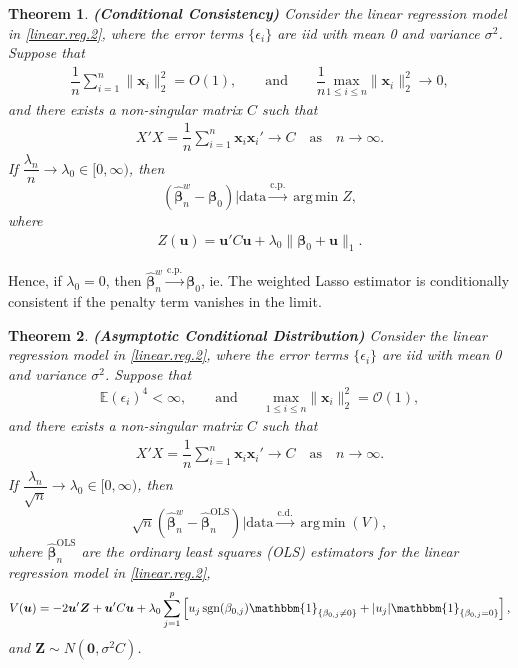 \documentclass[12pt]{article}
\DeclareMathOperator*{\argmin}{arg\,min} %
\newcommand{\EX}{\mathbb{E}} %
\newcommand{\bnw}{\widehat{\bm{\beta}}_n^w} %
\newcommand{\bLS}{\widehat{\bm{\beta}}_n^{\text{OLS}}} %
\newcommand{\be}{\bm{\beta}} %
\newcommand{\sumin}{\sum_{i=1}^n} %
\newcommand{\dn}{\dfrac{1}{n}} %
\newcommand{\CONV}[1]{\stackrel{\text{#1}}{\longrightarrow}} %
\newcommand{\x}{\bm{x}_i} %
\newcommand{\bu}{\bm{u}} %
\newtheorem{thm}{Theorem}[section]
\begin{document}
\begin{thm} \label{consistency}
	\textbf{(Conditional Consistency)} Consider the linear regression model in \eqref{linear.reg.2}, where the error terms $\{\epsilon_i\}$ are iid with mean 0 and variance $\sigma^2$. Suppose that 
		\begin{align*}
		\dn \sumin \| \x  \|_2^2 = O(1),
		\qquad \text{and} \qquad
		\dn \underset{1 \leq i \leq n}{\text{max}} \| \x  \|_2^2 \to 0, 
		\end{align*}
	and there exists a non-singular matrix $C$ such that
		\begin{align*}
		X'X = \dn \sumin \x \x' \to C 
		\quad \text{as} \quad n \to \infty.
		\end{align*}
	If $\dfrac{\lambda_n}{n} \to \lambda_0 \in [0,\infty)$, then 
		$$
		\left( \bnw - \be_0 \right) \bigg| \text{data} \CONV{c.p.} \argmin Z,
		$$
	where
		\begin{align*} 
		Z(\bu) = \bu' C \bu 
					+ \lambda_0 \| \be_0 + \bu \|_1 .
		\end{align*}  
\end{thm}

Hence, if $\lambda_0 = 0$, then $\bnw \CONV{c.p.} \be_0$, ie. The weighted Lasso estimator is conditionally consistent if the penalty term vanishes in the limit.     

\begin{thm} \label{asympdistn}
	\textbf{(Asymptotic Conditional Distribution)} Consider the linear regression model in \eqref{linear.reg.2}, where the error terms $\{\epsilon_i\}$ are iid with mean 0 and variance $\sigma^2$. Suppose that  
		\begin{align*}
		\EX (\epsilon_i)^4 < \infty,
		\qquad \text{and} \qquad
		\underset{1 \leq i \leq n}{\text{max}} \| \x  \|_2^2 = \mathcal{O} (1), 
		\end{align*}
	and there exists a non-singular matrix $C$ such that
		\begin{align*}
		X'X = \dn \sumin \x \x' \to C 
		\quad \text{as} \quad n \to \infty.
		\end{align*}
	If $\dfrac{\lambda_n}{\sqrt{n}} \to \lambda_0 \in [0,\infty)$, then
		$$
		\sqrt{n} \left( 
					\bnw - \bLS 
				\right) 
		\bigg| \text{data} 
		\CONV{c.d.} \argmin (V),
		$$
	where $\bLS$ are the ordinary least squares (OLS) estimators for the linear regression model in \eqref{linear.reg.2},   
		$$
		V(\bu) = -2 \bu' \bm{Z} + \bu' C \bu 
			 	+ \lambda_0 \sum_{j=1}^p 
			 		\left[
						u_j \, \text{sgn}(\beta_{0,j}) \mathbbm{1}_{ \{ \beta_{0,j} \neq 0 \}}
						+ | u_j | \mathbbm{1}_{ \{ \beta_{0,j} = 0 \}} 
			 		\right],
		$$
	and $\bm{Z} \sim N \left( \bm{0}, \sigma^2 C \right)$.
\end{thm}
\end{document}

